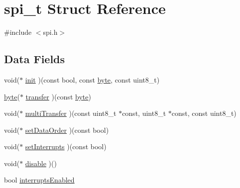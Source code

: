 \hypertarget{a00008}{\section{spi\-\_\-t Struct Reference}
\label{a00008}
}


{\ttfamily \#include $<$spi.\-h$>$}

\subsection*{Data Fields}
\begin{DoxyCompactItemize}
\item 
void($\ast$ \hyperlink{a00008_ab9c4dfca1c1af728c12afa53a6af3116}{init} )(const bool, const \hyperlink{a00011_a82b52bf2b45e214a8f2100ebfdf1aee4}{byte}, const uint8\-\_\-t)
\item 
\hyperlink{a00011_a82b52bf2b45e214a8f2100ebfdf1aee4}{byte}($\ast$ \hyperlink{a00008_a0720e9cd5a2231ab20699f520d4148b3}{transfer} )(const \hyperlink{a00011_a82b52bf2b45e214a8f2100ebfdf1aee4}{byte})
\item 
void($\ast$ \hyperlink{a00008_a469d031f7b9ff3389e7234f742421dc9}{multi\-Transfer} )(const uint8\-\_\-t $\ast$const, uint8\-\_\-t $\ast$const, const uint8\-\_\-t)
\item 
void($\ast$ \hyperlink{a00008_a0f77f6f3d49a8247eaa9c2e9a23194b0}{set\-Data\-Order} )(const bool)
\item 
void($\ast$ \hyperlink{a00008_af944febbd807cf8744ee0637754a7c8b}{set\-Interrupts} )(const bool)
\item 
void($\ast$ \hyperlink{a00008_a57d499a7d38ead0a94592ff9bc95e197}{disable} )()
\item 
bool \hyperlink{a00008_aa4467a109fa5d9e59a4b36f4a9728987}{interrupts\-Enabled}
\end{DoxyCompactItemize}


